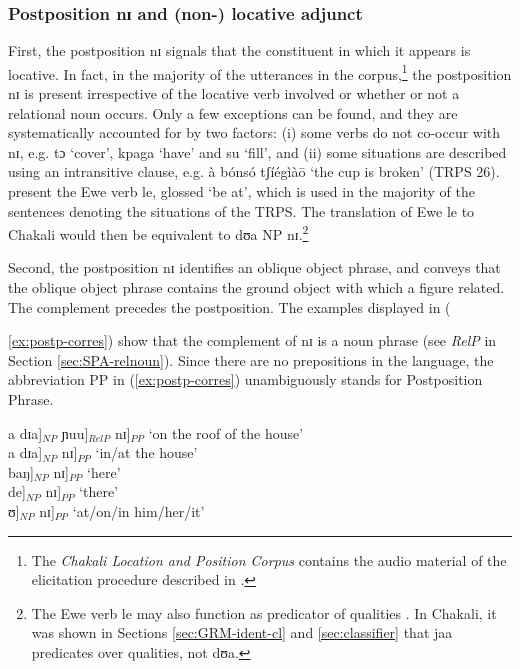 \begin{exe}
\begin{exe}
\begin{exe}
\subsubsection{Postposition {\sls nɪ} and (non-) locative adjunct}
\label{sec:SPA-postp}

First, the postposition {\sls nɪ} signals  that the constituent in which it  
appears  is locative.  In fact, in the majority of the  utterances in the 
 corpus,\footnote{\label{ft:spatial-corpus}The {\it Chakali Location and 
Position Corpus} 
\citep{JAB-space-C-10} contains the audio material of the elicitation 
procedure described in \citet{Bowe93, Amek99, Meir01a, Meir01b}.}  the  
postposition {\sls nɪ} is present irrespective of the
locative verb involved or whether or not a relational noun occurs. Only a  few
exceptions can be found,   and they are
systematically accounted for by two factors: (i) some verbs  do not co-occur 
with {\sls nɪ}, e.g. {\sls tɔ} `cover', {\sls kpaga} `have' and {\sls su} 
`fill',  
and (ii) some situations are described using an intransitive clause, e.g.   
{\sls 
à bónsó tʃíégìàō} `the cup is broken'  (TRPS 26).  
\citet[370]{Amek06} present the Ewe verb {\sls le}, glossed  `be at',  which is 
used in the majority of the sentences denoting the situations of the TRPS.   
The 
translation of  Ewe {\sls le} to Chakali would then be equivalent to {\sls dʊa 
{\rm NP} nɪ}.\footnote{The Ewe verb {\sls le} may also function as predicator 
of 
qualities \citep[373]{Amek06}. In Chakali,  it was shown  in Sections 
\ref{sec:GRM-ident-cl} and \ref{sec:classifier} that   {\sls jaa} predicates 
over 
qualities,  not  {\sls dʊa}.}



Second, the postposition {\sls nɪ} identifies an oblique object phrase, and
 conveys that the oblique object phrase contains the ground object with which a 
figure related. The complement precedes the  postposition. The examples  
displayed in ({\ref{ex:postp-corres}) show that the complement of  {\sls nɪ} is 
a 
noun phrase (see {\it RelP} in Section \ref{sec:SPA-relnoun}). Since there are 
no prepositions in the language, the abbreviation PP in 
({\ref{ex:postp-corres}}) unambiguously stands for Postposition Phrase.

\ea\label{ex:postp-corres}
 \ea {[}{[}{[}a dɪa{]}$_{NP}$ ɲuu{]}$_{RelP}$ nɪ{]}$_{PP}$  {\rm `on the roof 
of the 
house'}\\
 \ex {[}{[}a dɪa{]}$_{NP}$ nɪ{]}$_{PP}$ {\rm  `in/at the house'}\\
 \ex  {[}{[}baŋ{]}$_{NP}$ nɪ{]}$_{PP}$ {\rm  `here'}\\
 \ex {[}{[}de{]}$_{NP}$ nɪ{]}$_{PP}$  {\rm `there'}\\
 \ex {[}{[}ʊ{]}$_{NP}$ nɪ{]}$_{PP}$  {\rm `at/on/in him/her/it'}\\
\z
\z

}
\end{exe}
\end{exe}
\end{exe}
